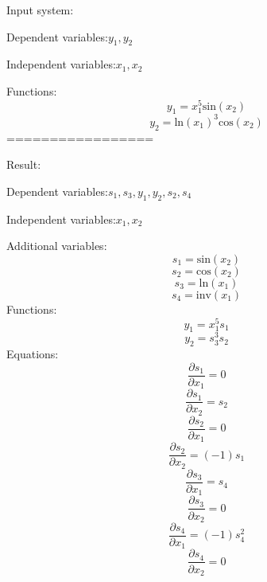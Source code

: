 \documentclass[10pt,a4paper]{article}
\begin{document}
Input system:

Dependent variables:$y_{1}, y_{2}$

Independent variables:$x_{1}, x_{2}$

Functions:
\begin{dmath*}y_{1} = x_{1} ^ {5}  \text{sin}\left(x_{2}\right)\end{dmath*}
\begin{dmath*}y_{2} = \text{ln}\left(x_{1}\right) ^ {3}  \text{cos}\left(x_{2}\right)\end{dmath*}
=================

Result:

Dependent variables:$s_{1}, s_{3}, y_{1}, y_{2}, s_{2}, s_{4}$

Independent variables:$x_{1}, x_{2}$

Additional variables:
\begin{dmath*}s_{1} = \text{sin}\left(x_{2}\right)\end{dmath*}
\begin{dmath*}s_{2} = \text{cos}\left(x_{2}\right)\end{dmath*}
\begin{dmath*}s_{3} = \text{ln}\left(x_{1}\right)\end{dmath*}
\begin{dmath*}s_{4} = \text{inv}\left(x_{1}\right)\end{dmath*}
Functions:
\begin{dmath*}y_{1} = x_{1} ^ {5}  s_{1}\end{dmath*}
\begin{dmath*}y_{2} = s_{3} ^ {3}  s_{2}\end{dmath*}
Equations:
\begin{dmath*}\frac{\partial s_{1}}{\partial x_{1}} = 0\end{dmath*}
\begin{dmath*}\frac{\partial s_{1}}{\partial x_{2}} = s_{2}\end{dmath*}
\begin{dmath*}\frac{\partial s_{2}}{\partial x_{1}} = 0\end{dmath*}
\begin{dmath*}\frac{\partial s_{2}}{\partial x_{2}} = \left(-1\right)  s_{1}\end{dmath*}
\begin{dmath*}\frac{\partial s_{3}}{\partial x_{1}} = s_{4}\end{dmath*}
\begin{dmath*}\frac{\partial s_{3}}{\partial x_{2}} = 0\end{dmath*}
\begin{dmath*}\frac{\partial s_{4}}{\partial x_{1}} = \left(-1\right)  s_{4} ^ {2}\end{dmath*}
\begin{dmath*}\frac{\partial s_{4}}{\partial x_{2}} = 0\end{dmath*}
\end{document}
